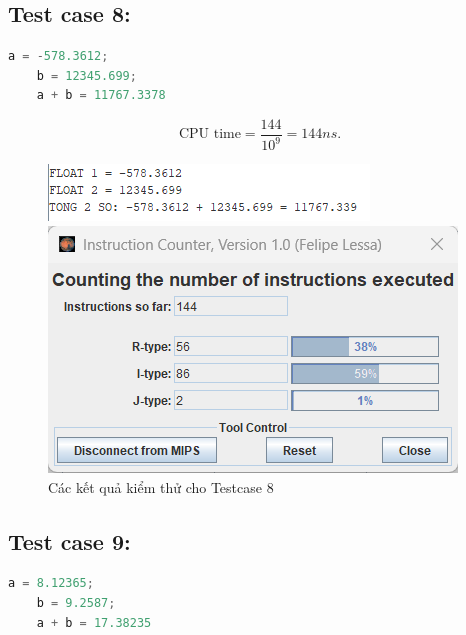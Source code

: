 \subsection{Test case 8:}
\begin{lstlisting}[language=Python]
    a = -578.3612;
    b = 12345.699;
    a + b = 11767.3378
\end{lstlisting}
\[
\text{CPU time} = \frac{\text{144}}{10^9} = 144ns.
\]
\begin{figure}[!h]
    \centering
    \begin{minipage}[b]{0.48\textwidth}
        \centering
        \includegraphics[width=\textwidth]{image/TESTCASE/Testcase 8.png}
    \end{minipage}
    \hfill
    \begin{minipage}[b]{0.48\textwidth}
        \centering
        \includegraphics[width=\textwidth]{image/TESTCASE/Instruction Counter 8.png}
    \end{minipage}
    \vspace{0.5cm}
    \caption{Các kết quả kiểm thử cho Testcase 8}
\end{figure}


\subsection{Test case 9:}
\begin{lstlisting}[language=Python]
    a = 8.12365;
    b = 9.2587;
    a + b = 17.38235
\end{lstlisting}


